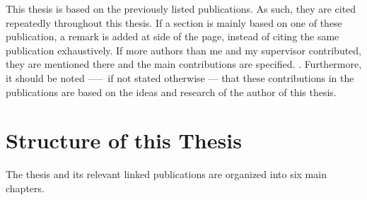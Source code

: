 This thesis is based on the previously listed publications. As such, they are cited repeatedly throughout this thesis. If a section is mainly based on one of these publication, a remark is added at side of the page, instead of citing the same publication exhaustively. If more authors than me and my supervisor contributed, they are mentioned there and the main contributions are specified.
. Furthermore, it should be noted ––– if not stated otherwise ---  that these contributions in the publications are based on the ideas and research of the author of this thesis.

\section{Structure of this Thesis}

The thesis and its relevant linked publications are organized into six main chapters.
